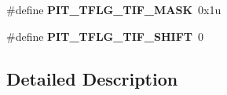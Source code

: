 \begin{DoxyCompactItemize}
\item 
\hypertarget{group___p_i_t___register___masks_ga9de8d708b43c9ca35df26c7b43f09769}{}\#define {\bfseries P\+I\+T\+\_\+\+T\+F\+L\+G\+\_\+\+T\+I\+F\+\_\+\+M\+A\+S\+K}~0x1u\label{group___p_i_t___register___masks_ga9de8d708b43c9ca35df26c7b43f09769}

\item 
\hypertarget{group___p_i_t___register___masks_gaf6f5ddca2193ed04bc61bc3e899f5ced}{}\#define {\bfseries P\+I\+T\+\_\+\+T\+F\+L\+G\+\_\+\+T\+I\+F\+\_\+\+S\+H\+I\+F\+T}~0\label{group___p_i_t___register___masks_gaf6f5ddca2193ed04bc61bc3e899f5ced}

\end{DoxyCompactItemize}


\subsection{Detailed Description}
